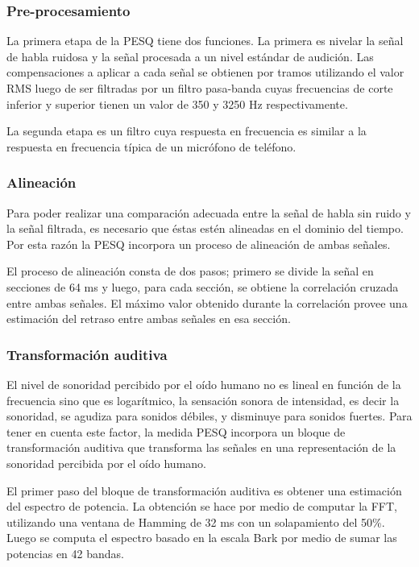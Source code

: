 \subsubsection{Pre-procesamiento}

La primera etapa de la PESQ tiene dos funciones. La primera es nivelar la señal de habla ruidosa y la señal procesada a un nivel estándar de audición. Las compensaciones a aplicar a cada señal se obtienen por tramos utilizando el valor RMS luego de ser filtradas por un filtro pasa-banda cuyas frecuencias de corte inferior y superior tienen un valor de 350 y 3250 Hz respectivamente.

La segunda etapa es un filtro cuya respuesta en frecuencia es similar a la respuesta en frecuencia típica de un micrófono de teléfono.

\subsubsection{Alineación}

Para poder realizar una comparación adecuada entre la señal de habla sin ruido y la señal filtrada, es necesario que éstas estén alineadas en el dominio del tiempo. Por esta razón la PESQ incorpora un proceso de alineación de ambas señales.

El proceso de alineación consta de dos pasos; primero se divide la señal en secciones de 64 ms y luego, para cada sección, se obtiene la correlación cruzada entre ambas señales. El máximo valor obtenido durante la correlación provee una estimación del retraso entre ambas señales en esa sección.

\subsubsection{Transformación auditiva}

El nivel de sonoridad percibido por el oído humano no es lineal en función de la frecuencia sino que es logarítmico, la sensación sonora de intensidad, es decir la sonoridad, se agudiza para sonidos débiles, y disminuye para sonidos fuertes. Para tener en cuenta este factor, la medida PESQ incorpora un bloque de transformación auditiva que transforma las señales en una representación de la sonoridad percibida por el oído humano.

El primer paso del bloque de transformación auditiva es obtener una estimación del espectro de potencia. La obtención se hace por medio de computar la FFT, utilizando una ventana de Hamming de 32 ms con un solapamiento del 50\%. Luego se computa el espectro basado en la escala Bark \cite{analytical_expressions_for_critical_band_rate_and_critical_bandwidth_as_a_function_of_frequency} por medio de sumar las potencias en 42 bandas.

